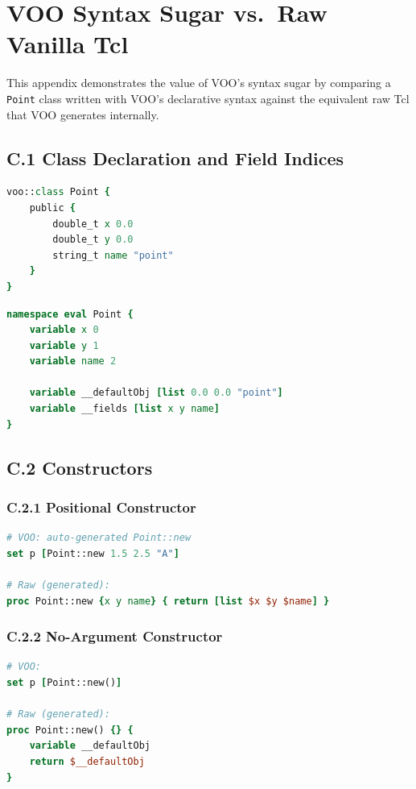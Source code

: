\section{VOO Syntax Sugar vs.\ Raw Vanilla Tcl}
\label{app:syntax}

This appendix demonstrates the value of VOO's syntax sugar by comparing a \texttt{Point}
class written with VOO's declarative syntax against the equivalent raw Tcl that VOO
generates internally.

\subsection*{C.1 Class Declaration and Field Indices}

\begin{lstlisting}[language=Tcl, caption={VOO syntax sugar: class and fields}]
voo::class Point {
    public {
        double_t x 0.0
        double_t y 0.0
        string_t name "point"
    }
}
\end{lstlisting}

\begin{lstlisting}[language=Tcl, caption={Raw Vanilla Tcl generated by VOO}]
namespace eval Point {
    variable x 0
    variable y 1
    variable name 2

    variable __defaultObj [list 0.0 0.0 "point"]
    variable __fields [list x y name]
}
\end{lstlisting}

\subsection*{C.2 Constructors}

\subsubsection*{C.2.1 Positional Constructor}
\begin{lstlisting}[language=Tcl]
# VOO: auto-generated Point::new
set p [Point::new 1.5 2.5 "A"]

# Raw (generated):
proc Point::new {x y name} { return [list $x $y $name] }
\end{lstlisting}

\subsubsection*{C.2.2 No-Argument Constructor}
\begin{lstlisting}[language=Tcl]
# VOO:
set p [Point::new()]

# Raw (generated):
proc Point::new() {} {
    variable __defaultObj
    return $__defaultObj
}
\end{lstlisting}

